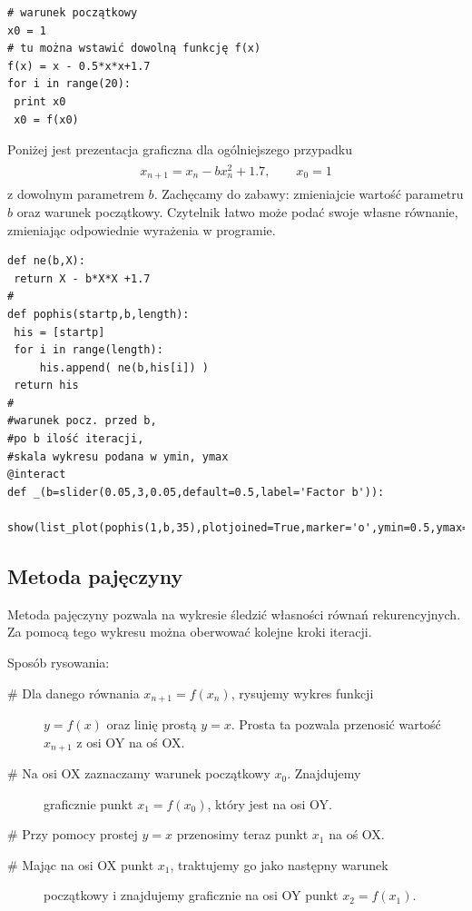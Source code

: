 \documentclass[a4paper,12pt,polish]{sphinxmanual}
\begin{document}
\begin{verbatim}
# warunek początkowy
x0 = 1
# tu można wstawić dowolną funkcję f(x)
f(x) = x - 0.5*x*x+1.7
for i in range(20):
 print x0
 x0 = f(x0)
\end{verbatim}


Poniżej jest prezentacja graficzna dla ogólniejszego przypadku
\label{ch1/chI031:equation-eqn4}\begin{gather}
\begin{split}x_{n+1} = x_n - b  x_{n}^2 +1.7, \qquad x_0 = 1\end{split}\label{ch1/chI031-eqn4}
\end{gather}
z dowolnym parametrem $b$. Zachęcamy do zabawy: zmieniajcie wartość parametru $b$ oraz warunek początkowy. Czytelnik łatwo może podać swoje własne równanie, zmieniając odpowiednie wyrażenia w programie.


\begin{verbatim}
def ne(b,X):
 return X - b*X*X +1.7
#
def pophis(startp,b,length):
 his = [startp]
 for i in range(length):
     his.append( ne(b,his[i]) )
 return his
#
#warunek pocz. przed b,
#po b ilość iteracji,
#skala wykresu podana w ymin, ymax
@interact
def _(b=slider(0.05,3,0.05,default=0.5,label='Factor b')):
 show(list_plot(pophis(1,b,35),plotjoined=True,marker='o',ymin=0.5,ymax=3))
\end{verbatim}



\subsection{Metoda pajęczyny}
\label{ch1/chI031:metoda-pajeczyny}
Metoda pajęczyny pozwala na wykresie śledzić własności równań rekurencyjnych.   Za pomocą tego wykresu  można oberwować kolejne kroki iteracji.

Sposób rysowania:
\begin{description}
\item[{\# Dla danego równania  $x_{n+1} = f(x_n)$, rysujemy wykres funkcji}] \leavevmode
$y = f (x)$ oraz  linię prostą $y  = x$. Prosta ta pozwala
przenosić wartość $x_{n+1}$  z osi OY na oś OX.

\item[{\# Na osi OX zaznaczamy warunek początkowy $x_0$. Znajdujemy}] \leavevmode
graficznie punkt $x_1 = f(x_0)$, który jest na osi OY.

\end{description}

\# Przy pomocy prostej $y=x$ przenosimy teraz  punkt $x_1$ na oś OX.
\begin{description}
\item[{\# Mając na osi OX punkt $x_1$, traktujemy go jako następny warunek}] \leavevmode
początkowy i znajdujemy graficznie na osi OY punkt $x_2=f(x_1)$.

\end{description}
\end{document}
